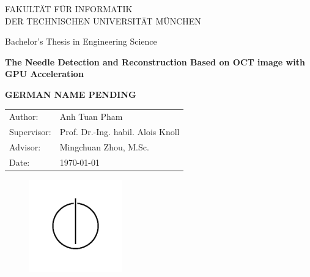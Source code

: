 



\thispagestyle{empty}

\vspace{7mm}
\begin{center}
  \oTUM{4cm}

  \vspace{5mm}
  \huge FAKULT{\"A}T F{\"U}R INFORMATIK\\
  \vspace{0.5cm}
  \large DER TECHNISCHEN UNIVERSIT{\"A}T M{\"U}NCHEN
\end{center}
\vspace{7mm}
\begin{center}

  {\Large Bachelor's Thesis in Engineering Science}

  \vspace{7mm}

  {\LARGE \textbf{The Needle Detection and Reconstruction Based on OCT image with GPU Acceleration}}\\

  \vspace{5mm}

  {\LARGE  	\textbf{GERMAN NAME PENDING}}\\

  \vspace{10mm}

  \begin{tabular}{ll}
    \Large Author:     & \Large Anh Tuan Pham \\[2mm]
    \Large Supervisor:    & \Large Prof. Dr.-Ing. habil. Alois Knoll\\[2mm]
    \Large Advisor:	& \Large Mingchuan Zhou, M.Sc.\\[2mm]
    \Large Date:       & \Large \today
  \end{tabular}

  \vspace{5mm}

   \begin{figure}[h!]
     \centering
     \includegraphics[width=4cm]{styles/informat.png}
   \end{figure}

  \vspace{10mm}

\end{center}

